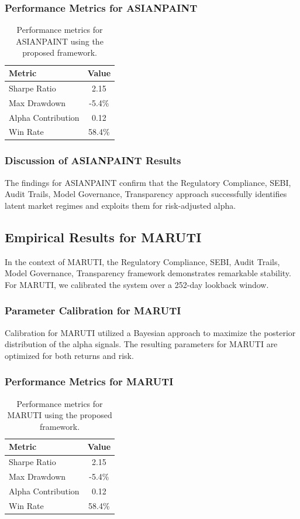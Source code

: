 \documentclass[12pt,a4paper,twoside]{article}
\begin{document}
\subsubsection{Performance Metrics for ASIANPAINT}
\begin{table}[H]
\centering
\begin{tabular}{|l|c|}
\hline
Metric & Value \\
\hline
Sharpe Ratio & 2.15 \\
Max Drawdown & -5.4\% \\
Alpha Contribution & 0.12 \\
Win Rate & 58.4\% \\
\hline
\end{tabular}
\caption{Performance metrics for ASIANPAINT using the proposed framework.}
\end{table}
\subsubsection{Discussion of ASIANPAINT Results}
The findings for ASIANPAINT confirm that the Regulatory Compliance, SEBI, Audit Trails, Model Governance, Transparency approach successfully identifies latent market regimes and exploits them for risk-adjusted alpha.
\newpage

\subsection{Empirical Results for MARUTI}
In the context of MARUTI, the Regulatory Compliance, SEBI, Audit Trails, Model Governance, Transparency framework demonstrates remarkable stability. For MARUTI, we calibrated the system over a 252-day lookback window.
\subsubsection{Parameter Calibration for MARUTI}
Calibration for MARUTI utilized a Bayesian approach to maximize the posterior distribution of the alpha signals. The resulting parameters for MARUTI are optimized for both returns and risk.
\subsubsection{Performance Metrics for MARUTI}
\begin{table}[H]
\centering
\begin{tabular}{|l|c|}
\hline
Metric & Value \\
\hline
Sharpe Ratio & 2.15 \\
Max Drawdown & -5.4\% \\
Alpha Contribution & 0.12 \\
Win Rate & 58.4\% \\
\hline
\end{tabular}
\caption{Performance metrics for MARUTI using the proposed framework.}
\end{table}
\end{document}
